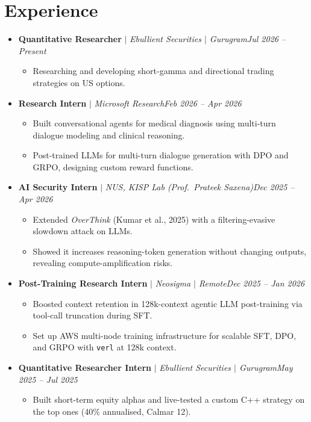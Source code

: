 \documentclass[10pt,letterpaper]{article}
\newcommand{\dates}[1]{\hfill{\color{dateblue}\itshape #1}}
\newcommand{\entry}[3]{\textbf{#1} $|$ \textit{#2}\dates{#3}}
\begin{document}
\section{Experience}
\begin{itemize}
  \item \entry{Quantitative Researcher}{Ebullient Securities $|$ Gurugram}{Jul 2026 -- Present}
  \begin{itemize}
    \item Researching and developing short-gamma and directional trading strategies on US options.
  \end{itemize}
  \item \entry{Research Intern}{Microsoft Research}{Feb 2026 -- Apr 2026}
  \begin{itemize}
    \item Built conversational agents for medical diagnosis using multi-turn dialogue modeling and clinical reasoning.
    \item Post-trained LLMs for multi-turn dialogue generation with DPO and GRPO, designing custom reward functions.
  \end{itemize}
  \item \entry{AI Security Intern}{NUS, KISP Lab (Prof.\ Prateek Saxena)}{Dec 2025 -- Apr 2026}
  \begin{itemize}
    \item Extended \textit{OverThink} (Kumar et al., 2025) with a filtering-evasive slowdown attack on LLMs.
    \item Showed it increases reasoning-token generation without changing outputs, revealing compute-amplification risks.
  \end{itemize}
  \item \entry{Post-Training Research Intern}{Neosigma $|$ Remote}{Dec 2025 -- Jan 2026}
  \begin{itemize}
    \item Boosted context retention in 128k-context agentic LLM post-training via tool-call truncation during SFT.
    \item Set up AWS multi-node training infrastructure for scalable SFT, DPO, and GRPO with \texttt{verl} at 128k context.
  \end{itemize}
  \item \entry{Quantitative Researcher Intern}{Ebullient Securities $|$ Gurugram}{May 2025 -- Jul 2025}
  \begin{itemize}
    \item Built short-term equity alphas and live-tested a custom C++ strategy on the top ones (40\% annualised, Calmar 12).

\end{itemize}
\end{itemize}
\end{document}
